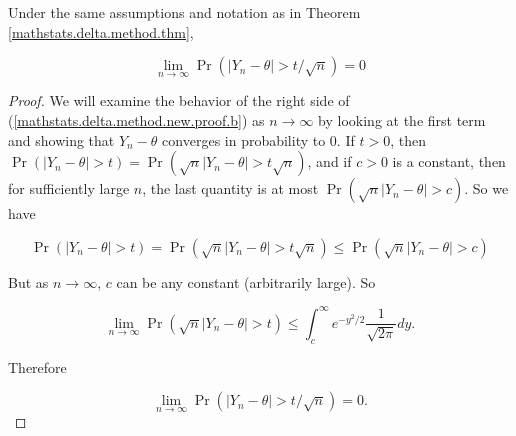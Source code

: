 \begin{lemma} Under the same assumptions and notation as in Theorem \ref{mathstats.delta.method.thm},

\[
\lim_{n \to \infty} \Pr(|Y_n - \theta| > t/\sqrt{n}) = 0
\] 

\end{lemma}

\begin{proof} We will examine the behavior of the right side of (\ref{mathstats.delta.method.new.proof.b}) as \(n \to \infty\) by looking at the first term and showing that \(Y_n - \theta\) converges in probability to 0. If \(t >0\), then \(\Pr(|Y_n - \theta| > t) = \Pr(\sqrt{n} |Y_n - \theta| > t \sqrt{n})\), and if \(c >0 \) is a constant, then for sufficiently large \(n\), the last quantity is at most \(\Pr(\sqrt{n} |Y_n - \theta| > c)\). So we have

\[
\Pr(|Y_n - \theta | > t) = \Pr(\sqrt{n} |Y_n - \theta | > t \sqrt{n}) \leq \Pr(\sqrt{n} |Y_n - \theta|  > c)
\]

But as \(n \to \infty\), \(c\) can be any constant (arbitrarily large). So

\[
\lim_{n \to \infty} \Pr(\sqrt{n}|Y_n - \theta  |> t) \leq \int_{c}^\infty e^{-y^2/2} \frac{1}{\sqrt{2 \pi}} dy.
\] 

Therefore

\[
\lim_{n \to \infty} \Pr(|Y_n - \theta| > t/\sqrt{n}) = 0.
\] 

\end{proof}

